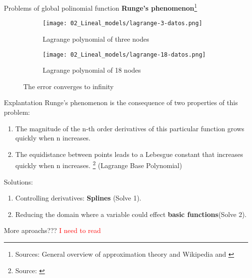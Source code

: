 \begin{frame}{Problems of global polinomial function}
  \textbf{Runge's phenomenon}\footnote{Sources: 
  General overview of approximation theory \cite{ACourseInApproximationTheory} 
  and Wikipedia \cite{Splines} and \cite{RungePhenomenon}}
  \begin{figure}
    \centering
    \begin{subfigure}[b]{0.4\textwidth}
        \centering
        \texttt{[image: 02\_Lineal\_models/lagrange-3-datos.png]}
        \caption[]%
        {{\small Lagrange polynomial of three nodes}}    
        \label{fig:mean and std of net14}
    \end{subfigure}
    \hfill
    \begin{subfigure}[b]{0.4\textwidth}   
        \centering 
        \texttt{[image: 02\_Lineal\_models/lagrange-18-datos.png]}
        \caption[]%
        {{\small Lagrange polynomial of 18 nodes}}    
        \label{fig:}
    \end{subfigure}
    \caption[ The error converges to infinity]
    {\small The error converges to infinity} 
    \label{fig:01errorToInfinty}
  \end{figure}
\end{frame}

\begin{frame}{Explantation}
  Runge's phenomenon is the consequence of two properties of this problem: 
  \begin{enumerate}
    \item   The magnitude of the n-th order derivatives of this particular function grows quickly when n increases.
    \item   The equidistance between points leads to a Lebesgue constant that increases quickly when n increases. \footnote{Source: \cite{LebesgueConstant}} (Lagrange Base Polynomial)
  \end{enumerate}

  Solutions: 
  \begin{enumerate}
    \item Controlling derivatives: \textbf{Splines} (Solve 1).
    \item Reducing the domain where a variable could effect \textbf{basic functions}(Solve 2).
  \end{enumerate}

  More aproachs??? \textcolor{red}{I need to read \cite{ACourseInApproximationTheory}}
\end{frame}

